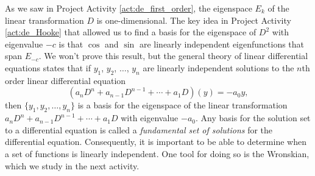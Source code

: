 \begin{pactivity}

	\ea
	
\end{pactivity}

As we saw in Project Activity \ref{act:de_first_order}, the eigenspace $E_{k}$ of the linear transformation $D$ is one-dimensional. The key idea in Project Activity \ref{act:de_Hooke} that allowed us to find a basis for the eigenspace of $D^2$ with eigenvalue $-c$ is that $\cos$ and $\sin$ are linearly independent eigenfunctions that span $E_{-c}$. We won't prove this result, but the general theory of linear differential equations states that if $y_1$, $y_2$, $\ldots$, $y_n$ are linearly independent solutions to the $n$th order linear differential equation
\[\left(a_nD^n + a_{n-1}D^{n-1} + \cdots + a_1D\right)(y) = -a_0y,\]
then $\{y_1, y_2, \ldots, y_n\}$ is a basis for the eigenspace of the linear transformation $a_nD^n + a_{n-1}D^{n-1} + \cdots + a_1D$ with eigenvalue $-a_0$. Any basis for the solution set to a differential equation is called a \emph{fundamental set of solutions} for the differential equation.  Consequently, it is important to be able to determine when a set of functions is linearly independent. One tool for doing so is the Wronskian, which we study in the next activity.


